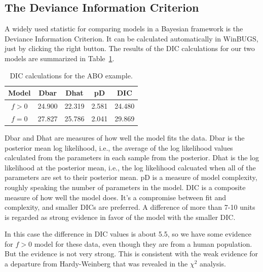 \documentclass[12pt]{article}
\begin{document}
\subsection*{The Deviance Information Criterion}

A widely used statistic for comparing models in a Bayesian framework
is the Deviance Information Criterion. It can be calculated automatically in WinBUGS, just by
clicking the right button. The results of the DIC calculations for our
two models are summarized in Table~\ref{table:ABO-dic}.

\begin{table}
\begin{center}
\begin{tabular}{c|cccc}
\hline\hline
Model   & Dbar   & Dhat   & pD    & DIC \\
\hline
$f > 0$ & 24.900 & 22.319 & 2.581 & 24.480 \\
$f = 0$ & 27.827 & 25.786 & 2.041 & 29.869 \\
\hline
\end{tabular}
\end{center}
\caption{DIC calculations for the ABO example.}\label{table:ABO-dic}
\end{table}

Dbar and Dhat are measures of how well the model fits the data. Dbar
is the posterior mean log likelihood, i.e., the average of the log
likelihood values calculated from the parameters in each sample from
the posterior. Dhat is the log likelihood at the posterior mean, i.e.,
the log likelihood calcuated when all of the parameters are set to
their posterior mean. pD is a measure of model complexity, roughly
speaking the number of parameters in the model. DIC is a composite
measure of how well the model does. It's a compromise between fit and
complexity, and smaller DICs are preferred. A difference of more than
7-10 units is regarded as strong evidence in favor of the model with
the smaller DIC. 

In this case the difference in DIC values is about 5.5, so we have
some evidence for $f > 0$ model for these data, even though they are
from a human population. But the evidence is not very strong. This is
consistent with the weak evidence for a departure from Hardy-Weinberg
that was revealed in the $\chi^2$ analysis.




\ccLicense
\end{document}
